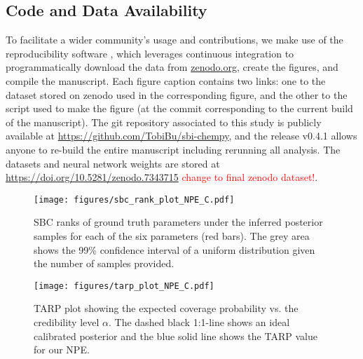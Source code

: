 \documentclass{aa}
\begin{document}
\begin{appendix}

\section{Code and Data Availability}
\label{sec:appendix_code_and_data}

To facilitate a wider community's usage and contributions, we make use of the reproducibility software
\href{https://github.com/showyourwork/showyourwork}{\showyourwork}
\citep{Luger2021}, which leverages continuous integration to
programmatically download the data from
\href{https://zenodo.org/}{zenodo.org}, create the figures, and
compile the manuscript. Each figure caption contains two links: one
to the dataset stored on zenodo used in the corresponding figure,
and the other to the script used to make the figure (at the commit
corresponding to the current build of the manuscript). The git
repository associated to this study is publicly available at
\url{https://github.com/TobiBu/sbi-chempy}, and the release
v0.4.1 allows anyone to re-build the entire manuscript including rerunning all analysis. The datasets and neural network weights are stored at \url{https://doi.org/10.5281/zenodo.7343715} \textcolor{red}{change to final zenodo dataset!}.

\begin{figure*}[]
     \centering
     \texttt{[image: figures/sbc\_rank\_plot\_NPE\_C.pdf]}
     \caption{SBC ranks of ground truth parameters under the inferred posterior samples for each of the six parameters (red bars). The grey area shows the 99\% confidence interval of a uniform distribution given the number of samples provided.}
     \label{fig:sbc}
\end{figure*}

\begin{figure}[]
     \centering
     \texttt{[image: figures/tarp\_plot\_NPE\_C.pdf]}
     \caption{TARP plot showing the expected coverage probability vs. the credibility level $\alpha$. The dashed black 1:1-line shows an ideal calibrated posterior and the blue solid line shows the TARP value for our NPE.}
     \label{fig:tarp}
\end{figure}


\end{appendix}
\end{document}
